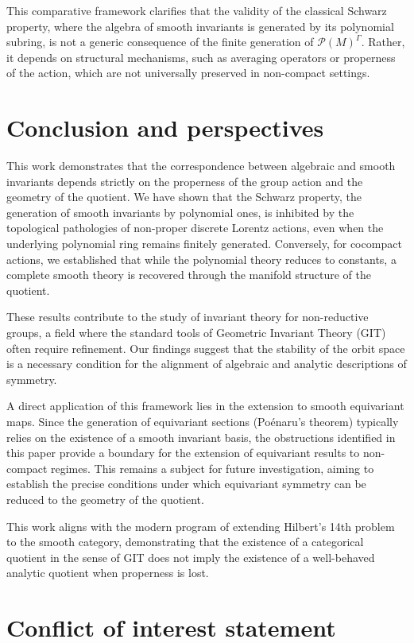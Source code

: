 \documentclass[]{article}
\begin{document}
This comparative framework clarifies that the validity of the classical Schwarz property, where the algebra of smooth invariants is generated by its polynomial subring, is not a generic consequence of the finite generation of $\mathcal{P}(M)^\Gamma$. Rather, it depends on structural mechanisms, such as averaging operators or properness of the action, which are not universally preserved in non-compact settings.

\section{Conclusion and perspectives}

This work demonstrates that the correspondence between algebraic and smooth invariants depends strictly on the properness of the group action and the geometry of the quotient. We have shown that the Schwarz property, the generation of smooth invariants by polynomial ones, is inhibited by the topological pathologies of non-proper discrete Lorentz actions, even when the underlying polynomial ring remains finitely generated. Conversely, for cocompact actions, we established that while the polynomial theory reduces to constants, a complete smooth theory is recovered through the manifold structure of the quotient.

These results contribute to the study of invariant theory for non-reductive groups, a field where the standard tools of Geometric Invariant Theory (GIT) often require refinement. Our findings suggest that the stability of the orbit space is a necessary condition for the alignment of algebraic and analytic descriptions of symmetry.

A direct application of this framework lies in the extension to smooth equivariant maps. Since the generation of equivariant sections (Poénaru’s theorem) typically relies on the existence of a smooth invariant basis, the obstructions identified in this paper provide a boundary for the extension of equivariant results to non-compact regimes. This remains a subject for future investigation, aiming to establish the precise conditions under which equivariant symmetry can be reduced to the geometry of the quotient.

This work aligns with the modern program of extending Hilbert's 14th problem to the smooth category, demonstrating that the existence of a categorical quotient in the sense of GIT does not imply the existence of a well-behaved analytic quotient when properness is lost.

\section*{Conflict of interest statement}
\end{document}
